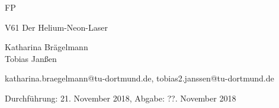 \newcommand{\Titel}{V61 Der Helium-Neon-Laser}
\newcommand{\DatumDu}{21. November 2018}
\newcommand{\DatumAb}{??. November 2018}
\newcommand{\Autoreins}{Katharina Brägelmann}
\newcommand{\Emaileins}{katharina.braegelmann@tu-dortmund.de}
\newcommand{\Autorzwei}{Tobias Janßen}
\newcommand{\Emailzwei}{tobias2.janssen@tu-dortmund.de}



\begin{titlepage}

\begin{center} \large

  FP
  \vspace*{2.5cm}

  {\huge \Titel}
  \vspace*{3cm}

  \Autoreins
  \\\Autorzwei
  \vspace*{1.5cm}

  \Emaileins, \Emailzwei


  Durchführung: \DatumDu, Abgabe: \DatumAb
  \vspace*{4.5cm}


\end{center}
\end{titlepage}
